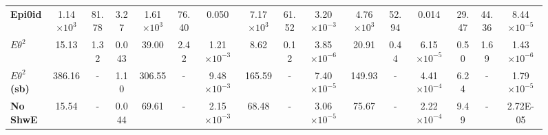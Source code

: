 \begin{figure}
\begin{scriptsize}
\begin{tabular}{|l|ccc|ccc|ccc|ccc|ccc|}
\textbf{Epi0id}       & 1.14$\times 10^3$           & 81.78                                                               & 3.27                                       & 1.61$\times 10^3$             & 76.40                                                                 & 0.050                                        & 7.17$\times 10^3$              & 61.52                                                                  & 3.20$\times 10^{-3}$                                      & 4.76$\times 10^3$          & 52.94                                                              & 0.014                                     & 29.47                & 44.36                                                                 & 8.44$\times 10^{-5}$                                     \\
\rowcolor[HTML]{67FD9A}
\textbf{$E\theta^2$}      & 15.13              & 1.32                                                                & 0.043                                      & 39.00                & 2.42                                                                  & 1.21$\times 10^{-3}$                                     & 8.62                  & 0.12                                                                   & 3.85$\times 10^{-6}$                                      & 20.91             & 0.44                                                               & 6.15$\times 10^{-5}$                                  & 0.50                 & 1.69                                                                  & 1.43$\times 10^{-6}$                                  \\\hline\hline
\textbf{$E\theta^2$ (sb)}  & 386.16             & -                                                            & 1.10                                       & 306.55               & -                                                                & 9.48$\times 10^{-3}$                                     & 165.59                & -                                                               & 7.40$\times 10^{-5}$                                      & 149.93            & -                                                             & 4.41$\times 10^{-4}$                                  & 6.24                 & -                                                              & 1.79$\times 10^{-5}$                                     \\\hline\hline
\textbf{No ShwE}  & 15.54              & -                                                                & 0.044                                      & 69.61                & -                                                                 & 2.15$\times 10^{-3}$                                     & 68.48                 & - & 3.06$\times 10^{-5}$                                      & 75.67             & - & 2.22$\times 10^{-4}$                                  & 9.49                 & -                                                                & 2.72E-05   \\\hline
\end{tabular}


\end{scriptsize}
\end{figure}

